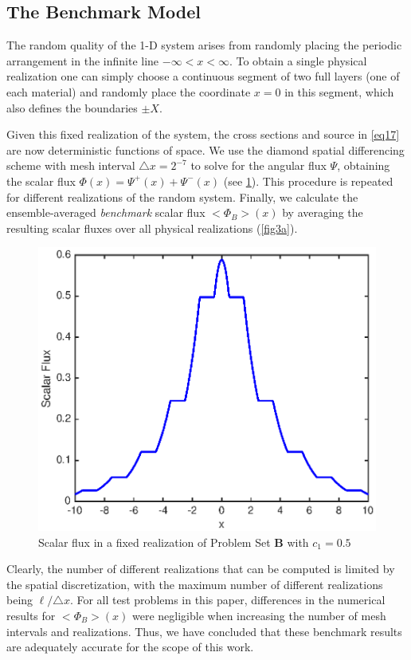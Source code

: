 \documentclass[12pt]{article}
\newcommand{\bl}{\big<}
\newcommand{\bg}{\big>}
\begin{document}
\subsection{The Benchmark Model}

The random quality of the 1-D system arises from randomly placing the periodic arrangement in the infinite line $-\infty<x<\infty$.
To obtain a single physical realization one can simply choose a continuous segment of two full layers (one of each material) and randomly place the coordinate $x=0$ in this segment, which also defines the boundaries $\pm X$.

Given this fixed realization of the system, the cross sections and source in \cref{eq17} are now deterministic functions of space.
We use the diamond spatial differencing scheme with mesh interval $\triangle x=2^{-7}$ to solve for the angular flux $\Psi$, obtaining the scalar flux $\Phi(x) = \Psi^+(x)+\Psi^-(x)$ (see \cref{fig4}).
This procedure is repeated for different realizations of the random system.
Finally, we calculate the ensemble-averaged {\em benchmark} scalar flux $\bl\Phi_B\bg(x)$ by averaging the resulting scalar fluxes over all physical realizations (\cref{fig3a}). 
\begin{figure}[htb]
  \centering
  \includegraphics[scale=1]{fig4.eps}
  \caption{Scalar flux in a fixed realization of Problem Set {\bf B} with $c_1=0.5$}
  \label{fig4}
\end{figure}

Clearly, the number of different realizations that can be computed is limited by the spatial discretization, with the maximum number of different realizations being $\ell/\triangle x$.
For all test problems in this paper, differences in the numerical results for $\bl\Phi_B\bg(x)$ were negligible when increasing the number of mesh intervals and realizations.
Thus, we have concluded that these benchmark results are adequately accurate for the scope of this work.
\end{document}
